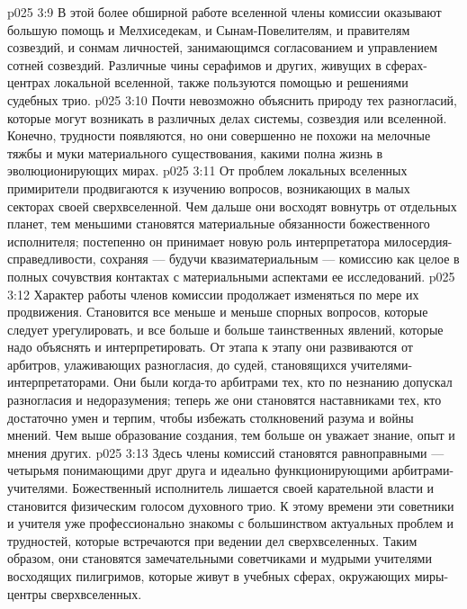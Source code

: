 \vs p025 3:9 \pc {}\bibnobreakspace {} В этой более обширной работе вселенной члены комиссии оказывают большую помощь и Мелхиседекам, и Сынам\hyp{}Повелителям, и правителям созвездий, и сонмам личностей, занимающимся согласованием и управлением сотней созвездий. Различные чины серафимов и других, живущих в сферах\hyp{}центрах локальной вселенной, также пользуются помощью и решениями судебных трио.
\vs p025 3:10 Почти невозможно объяснить природу тех разногласий, которые могут возникать в различных делах системы, созвездия или вселенной. Конечно, трудности появляются, но они совершенно не похожи на мелочные тяжбы и муки материального существования, какими полна жизнь в эволюционирующих мирах.
\vs p025 3:11 \pc {}\bibnobreakspace {} От проблем локальных вселенных примирители продвигаются к изучению вопросов, возникающих в малых секторах своей сверхвселенной. Чем дальше они восходят вовнутрь от отдельных планет, тем меньшими становятся материальные обязанности божественного исполнителя; постепенно он принимает новую роль интерпретатора милосердия\hyp{}справедливости, сохраняя --- будучи квазиматериальным --- комиссию как целое в полных сочувствия контактах с материальными аспектами ее исследований.
\vs p025 3:12 \pc {}\bibnobreakspace {} Характер работы членов комиссии продолжает изменяться по мере их продвижения. Становится все меньше и меньше спорных вопросов, которые следует урегулировать, и все больше и больше таинственных явлений, которые надо объяснять и интерпретировать. От этапа к этапу они развиваются от арбитров, улаживающих разногласия, до  судей, становящихся учителями\hyp{}интерпретаторами. Они были когда\hyp{}то арбитрами тех, кто по незнанию допускал разногласия и недоразумения; теперь же они становятся наставниками тех, кто достаточно умен и терпим, чтобы избежать столкновений разума и войны мнений. Чем выше образование создания, тем больше он уважает знание, опыт и мнения других.
\vs p025 3:13 \pc {}\bibnobreakspace {} Здесь члены комиссий становятся равноправными --- четырьмя понимающими друг друга и идеально функционирующими арбитрами\hyp{}учителями. Божественный исполнитель лишается своей карательной власти и становится физическим голосом духовного трио. К этому времени эти советники и учителя уже профессионально знакомы с большинством актуальных проблем и трудностей, которые встречаются при ведении дел сверхвселенных. Таким образом, они становятся замечательными советчиками и мудрыми учителями восходящих пилигримов, которые живут в учебных сферах, окружающих миры\hyp{}центры сверхвселенных.
